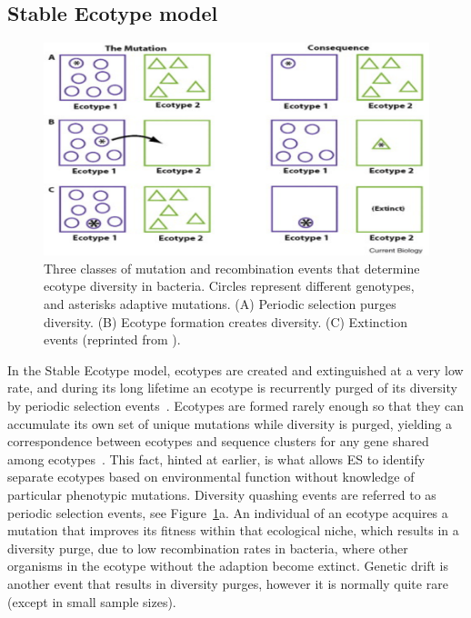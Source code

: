 \subsection*{Stable Ecotype model}

\begin{figure}[h!]
 \centering
 \label{fig:StableEvents}
 \includegraphics{images/StableEcotypeEvents-CH2}
 \caption[Events predicted by the Stable Ecotype model.]{Three classes of mutation and recombination events that determine ecotype diversity in bacteria. Circles represent different genotypes, and asterisks adaptive mutations. (A) Periodic selection purges diversity. (B) Ecotype formation creates diversity. (C) Extinction events (reprinted from \protect\cite{cohan2007systematics}).}
 \label{fig:StableEvents}
\end{figure}

In the Stable Ecotype model, ecotypes are created and extinguished at a very low rate, and during its long lifetime an ecotype is recurrently purged of its diversity by periodic selection events~\cite{cohan2007systematics}.
Ecotypes are formed rarely enough so that they can accumulate its own set of unique mutations while diversity is purged, yielding a correspondence between ecotypes and sequence clusters for any gene shared among ecotypes~\cite{cohan2008origins}.
This fact, hinted at earlier, is what allows ES to identify separate ecotypes based on environmental function without knowledge of particular phenotypic mutations.
Diversity quashing events are referred to as periodic selection events, see Figure~\ref{fig:StableEvents}a.
An individual of an ecotype acquires a mutation that improves its fitness within that ecological niche, which results in a diversity purge, due to low recombination rates in bacteria, where other organisms in the ecotype without the adaption become extinct.
Genetic drift is another event that results in diversity purges, however it is normally quite rare (except in small sample sizes).

